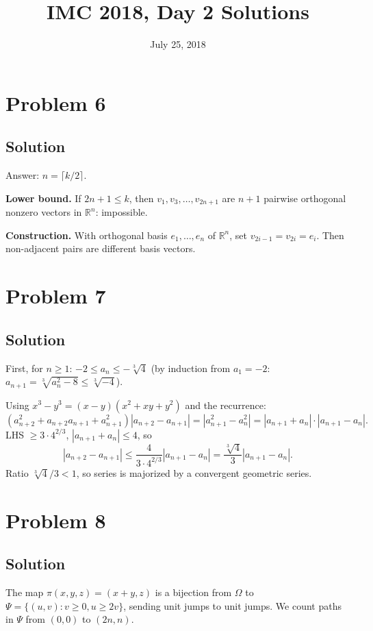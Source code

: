 \documentclass{article}
\title{IMC 2018, Day 2 Solutions}
\date{July 25, 2018}
\begin{document}
\maketitle

\section*{Problem 6}
\subsection*{Solution}
Answer: $n = \lceil k/2 \rceil$.

\textbf{Lower bound.} If $2n + 1 \leq k$, then $v_1, v_3, \ldots, v_{2n+1}$ are $n+1$ pairwise orthogonal nonzero vectors in $\mathbb{R}^n$: impossible.

\textbf{Construction.} With orthogonal basis $e_1, \ldots, e_n$ of $\mathbb{R}^n$, set $v_{2i-1} = v_{2i} = e_i$. Then non-adjacent pairs are different basis vectors.

\section*{Problem 7}
\subsection*{Solution}
First, for $n \geq 1$: $-2 \leq a_n \leq -\sqrt[3]{4}$ (by induction from $a_1 = -2$: $a_{n+1} = \sqrt[3]{a_n^2 - 8} \leq \sqrt[3]{-4}$).

Using $x^3 - y^3 = (x-y)(x^2 + xy + y^2)$ and the recurrence:
\[ (a_{n+2}^2 + a_{n+2} a_{n+1} + a_{n+1}^2) |a_{n+2} - a_{n+1}| = |a_{n+1}^2 - a_n^2| = |a_{n+1} + a_n| \cdot |a_{n+1} - a_n|. \]
LHS $\geq 3 \cdot 4^{2/3}$, $|a_{n+1} + a_n| \leq 4$, so
\[ |a_{n+2} - a_{n+1}| \leq \frac{4}{3 \cdot 4^{2/3}} |a_{n+1} - a_n| = \frac{\sqrt[3]{4}}{3} |a_{n+1} - a_n|. \]
Ratio $\sqrt[3]{4}/3 < 1$, so series is majorized by a convergent geometric series.

\section*{Problem 8}
\subsection*{Solution}
The map $\pi(x,y,z) = (x+y, z)$ is a bijection from $\Omega$ to $\Psi = \{(u,v) : v \geq 0, u \geq 2v\}$, sending unit jumps to unit jumps. We count paths in $\Psi$ from $(0,0)$ to $(2n,n)$.
\end{document}
